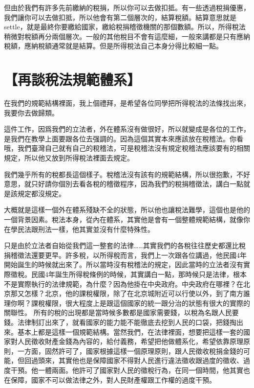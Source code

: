 \documentclass[]{ctexbook}
\begin{document}
但由於我們有許多先前繳納的稅捐，所以你可以去做扣抵。有一些透過稅捐優惠，我們讓你可以去做扣抵，所以他會有第二個層次的，結算稅額。結算意思就是settle，就是最終你要繳給國家，繳給稅捐稽徵機關的那個數額。所以，所得稅法稍微對稅額再分兩個層次。一般的其他稅目不會有這麼細，一般來講都是只有應納稅額，應納稅額通常就是結算。但是所得稅法自己本身分得比較細一點。

\hypertarget{ux518dux8ac7ux7a05ux6cd5ux898fux7bc4ux9ad4ux7cfb}{%
\section{【再談稅法規範體系】}\label{ux518dux8ac7ux7a05ux6cd5ux898fux7bc4ux9ad4ux7cfb}}

在我們的規範結構裡面，我上個禮拜，是希望各位同學把所得稅法的法條找出來，我要你去做歸類。

這件工作，因爲我們的立法者，外在體系沒有做很好，所以就變成是各位的工作，是我們在教學上面要跟各位去强調的。因為這個其實本來應該放在稅稽法。你看哦，我們臺灣自己就有自己的稅稽法，可是稅稽法沒有規定稅稽法應該要有的相關規定，所以他又放到所得稅法裡面去規定。

我們幾乎所有的稅都長這個樣子。稅稽法沒有該有的規範結構，所以很抱歉，不好意思，就只好請你個別去看各稅的稽徵程序，因為我們的稅捐稽徵法，講白一點就是該規定都沒規定。

大概就是這樣一個外在體系殘缺不全的狀態，所以他也讓稅法難學，這個也是他的一個背景因素。稅法本身，從內在體系，其實他是會有一個整體規範結構，就像你在學民法跟刑法一樣，他其實並沒有什麼特殊性。

只是由於立法者自始從我們這一整套的法律\ldots\ldots 其實我們的各稅往往歷史都還比稅捐稽徵法還要更早。許多稅，以所得稅而言，我們上一次跟各位講過，他民國4年開始誕生的時候就出來了。所以當時沒有稅稽法的規定，因此當時的立法者沒有實際徵稅。民國4年誕生所得稅條例的時候，其實講白一點，那時候只是法律，根本不是實際執行的法律規範，為什麼？因為他掛在中央政府。中央政府在哪裡？在北京那又怎樣？北京，他的課稅權限，除了在北京城附近可以行使以外，到了南方誰理你啊？課稅權限，很大程度上是跟這個國家的統一跟分治的狀態有很大的實際的關聯性。
所有的稅的出現都是當時候多數都是國家需要錢，以稅為名跟人民要錢。法律制訂出來了，就看國家的能力能不能徹底去挖到人民的口袋，把錢掏出來。基本上都是這樣一個規範結構。當然我們，在法律裡面，想要把這樣一套的國家對人民徵收財產金錢為內容的，給付義務，希望把他做體系化，希望依靠原理原則，一方面，固然許可了，國家根據這樣一個原理原則，跟人民徵收稅捐金錢的可能，但回過頭來，其實他也是保障國家不得對人民進行違法徵收跟過度的徵收、過度干預。他一體兩面。他許可了國家對人民的徵稅行為，在同一個時間，他其實也在保障，國家不可以做法律之外，對人民財產權跟工作權的過度干預。
\end{document}
